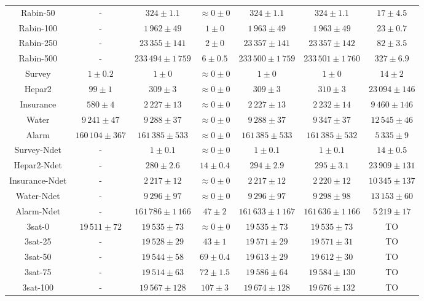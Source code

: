 \begin{table}[H]
\begin{adjustbox}{max width=\textwidth}
\begin{tabu}{c | c | ccc | c | c}
		\midrule
		Rabin-50 & - & $324\pm 1.1$ & {$\approx 0 \pm 0$} & {$ 324 \pm 1.1$} & {$ 324 \pm  1.1$} & $17 \pm 4.5$ \\
		Rabin-100 & - & $1\,962\pm 49$ & {$1 \pm 0$} & {$ 1\,963 \pm  49$} & {$ 1\,963 \pm  49$} & $23 \pm 0.7$ \\
		Rabin-250 & - & $23\,355\pm 141$ & {$2 \pm 0$} & {$ 23\,357 \pm  141$} & {$ 23\,357 \pm  142$} & $82 \pm 3.5$ \\
		Rabin-500 & - & $233\,494\pm 1\,759$ & {$6 \pm 0.5$} & {$233\,500 \pm 1\,759$} & {$233\,501 \pm 1\,760$} & $327 \pm 6.9$ \\
		
		\midrule 
		Survey & $1 \pm 0.2$ & $1 \pm 0$ & $\approx 0 \pm 0$ & $1 \pm 0$ & $1 \pm 0$ & $14 \pm 2$  \\
		Hepar2 & $99 \pm 1$ & $309 \pm 3$ & $\approx 0 \pm 0$ & $309 \pm 3$ & $310 \pm 3$ & $23\,094 \pm 146$ \\
		Insurance & $580 \pm 4$ & $2\,227 \pm 13$ & $\approx 0 \pm 0$ & $2\,227 \pm 13$ & $2\,232 \pm 14$ & $9\,460 \pm 146$ \\
		Water & $9\,241 \pm 47$ & $9\,288 \pm 37$ & $\approx 0 \pm 0$ & $9\,288 \pm 37$  & $9\,347 \pm 37$   & $12\,545 \pm 46$ \\
		Alarm & $160\,104 \pm 367$ & $161\,385 \pm 533$ & $\approx 0 \pm 0$ & $161\,385 \pm 533$ & $161\,385 \pm 532$ & $5\,335 \pm 9$ \\
		
		\midrule 
		Survey-Ndet & - & $1 \pm 0.1$ & $\approx 0 \pm 0$ & $1 \pm 0.1$ & $1 \pm 0.1$ & $14 \pm 0.5$ \\
		Hepar2-Ndet & - & $280 \pm 2.6$ & $14 \pm 0.4$ & $294 \pm 2.9$ & $295 \pm 3.1$ & $23\,909 \pm 131$ \\
		Insurance-Ndet & - & $2\,217 \pm 12$ & $\approx 0 \pm 0$ & $2\,217 \pm 12$ & $2\,220 \pm 12$ & $10\,345 \pm 137$ \\
		Water-Ndet & - & $9\,296 \pm 97$ & $\approx 0 \pm 0$ & $9\,296 \pm 97$ & $9\,298 \pm 98$ & $13\,153 \pm 60$ \\
		Alarm-Ndet & - & $161\,786 \pm 1\,166$ & $47 \pm 2$ & $161\,633 \pm 1\,167$ & $161\,636 \pm 1\,166$ & $5\,219 \pm 17$ \\
		
		\midrule
		3sat-0 & $19\,511 \pm 72$ & $19\,535 \pm 73$ & {$\approx 0 \pm 0$} & {$19\,535 \pm 73$} & {$19\,535 \pm 73$} & TO \\
		3sat-25 & - & $19\,528 \pm 29$ & {$43 \pm 1$} & {$19\,571 \pm 29$} & {$19\,571 \pm 31$} & TO \\
		3sat-50 & - & $19\,544 \pm 58$ & {$69 \pm 0.4$} & {$19\,613 \pm 29$} & {$19\,612 \pm 30$} & TO \\
		3sat-75 & - & $19\,514 \pm 63$ & {$72 \pm 1.5$} & {$19\,586 \pm 64$} & {$19\,584 \pm 130$} & TO \\
		3sat-100 & - & $19\,567 \pm 128$ & {$107 \pm 3$} & {$19\,674 \pm 128$} & {$19\,676 \pm 132$} & TO \\
		\bottomrule 
	\end{tabu}


\end{adjustbox}
\end{table}
